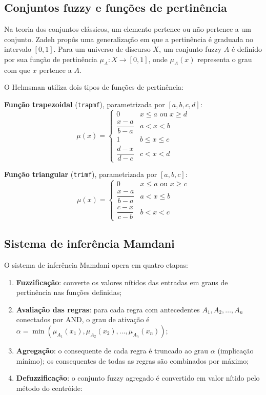 \documentclass[12pt, a4paper]{article}
\begin{document}
\subsection{Conjuntos fuzzy e funções de pertinência}

Na teoria dos conjuntos clássicos, um elemento pertence ou não pertence a um conjunto. Zadeh \cite{zadeh1965} propôs uma generalização em que a pertinência é graduada no intervalo $[0, 1]$. Para um universo de discurso $X$, um conjunto fuzzy $A$ é definido por sua função de pertinência $\mu_A: X \rightarrow [0, 1]$, onde $\mu_A(x)$ representa o grau com que $x$ pertence a $A$.

O Helmsman utiliza dois tipos de funções de pertinência:

\textbf{Função trapezoidal} (\texttt{trapmf}), parametrizada por $[a, b, c, d]$:
\begin{equation}
  \mu(x) =
  \begin{cases}
    0                     & x \leq a \text{ ou } x \geq d \\
    \dfrac{x - a}{b - a}  & a < x < b \\
    1                     & b \leq x \leq c \\
    \dfrac{d - x}{d - c}  & c < x < d
  \end{cases}
\end{equation}

\textbf{Função triangular} (\texttt{trimf}), parametrizada por $[a, b, c]$:
\begin{equation}
  \mu(x) =
  \begin{cases}
    0                     & x \leq a \text{ ou } x \geq c \\
    \dfrac{x - a}{b - a}  & a < x \leq b \\
    \dfrac{c - x}{c - b}  & b < x < c
  \end{cases}
\end{equation}

\subsection{Sistema de inferência Mamdani}
\label{sec:mamdani}

O sistema de inferência Mamdani \cite{mamdani1975} opera em quatro etapas:

\begin{enumerate}
  \item \textbf{Fuzzificação}: converte os valores nítidos das entradas em graus de pertinência nas funções definidas;
  \item \textbf{Avaliação das regras}: para cada regra com antecedentes $A_1, A_2, \ldots, A_n$ conectados por AND, o grau de ativação é $\alpha = \min(\mu_{A_1}(x_1), \mu_{A_2}(x_2), \ldots, \mu_{A_n}(x_n))$;
  \item \textbf{Agregação}: o consequente de cada regra é truncado ao grau $\alpha$ (implicação mínimo); os consequentes de todas as regras são combinados por máximo;
  \item \textbf{Defuzzificação}: o conjunto fuzzy agregado é convertido em valor nítido pelo método do centróide:
\end{enumerate}
\end{document}
